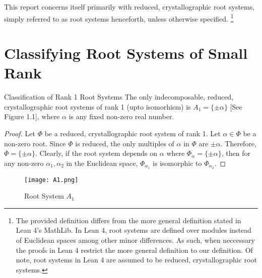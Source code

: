 This report concerns itself primarily with reduced, crystallographic root systems, simply referred to as root systems henceforth,
unless otherwise specified. \footnote{
    The provided definition differs from the more general definition stated in Lean 4's MathLib.
    In Lean 4, root systems are defined over modules instead of Euclidean spaces among other minor differences.
    As such, when neccessary the proofs in Lean 4 restrict the more general definition to our definition.
    Of note, root systems in Lean 4 are assumed to be reduced, crystallographic root systems.} \newline

    \section{Classifying Root Systems of Small Rank}

\begin{namedtheorem}{Classification of Rank 1 Root Systems}
    The only indecomposable, reduced, crystallographic root systems of rank 1 (upto isomorhism) is $A_1 = \{ \pm \alpha \}$ [See Figure 1.1], where $\alpha$ is any fixed non-zero real number.
\end{namedtheorem}

\begin{proof}
    Let $\Phi$ be a reduced, crystallographic root system of rank 1.
    Let $\alpha \in \Phi$ be a non-zero root.
    Since $\Phi$ is reduced, the only multiples of $\alpha$ in $\Phi$ are $\pm \alpha$.
    Therefore, $\Phi = \{ \pm \alpha \}$.
    Clearly, if the root system depends on $\alpha$ where $\Phi_{\alpha} = \{ \pm \alpha \}$,
    then for any non-zero $\alpha_1, \alpha_2$ in the Euclidean space, $\Phi_{\alpha_1}$ is isomorphic
    to $\Phi_{\alpha_2}$.
\end{proof}

\begin{figure}[h]
    \centering
    \texttt{[image: A1.png]}
    \caption{Root System $A_1$}
\end{figure}

